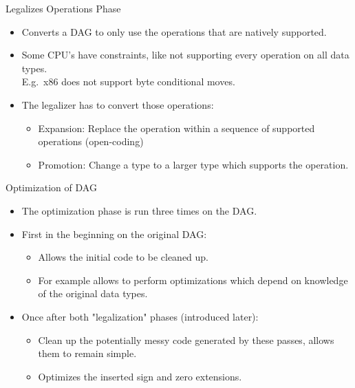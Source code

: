 \documentclass[]{beamer}
\begin{document}
\begin{frame}{Legalizes Operations Phase}
\begin{itemize}
  \item Converts a DAG to only use the operations that are natively supported.
  \item Some CPU's have constraints, like not supporting every operation on all data types.\\
        E.g.\ x86 does not support byte conditional moves.
  \item The legalizer has to convert those operations:
  \begin{itemize}
    \item Expansion: Replace the operation within a sequence of supported operations (open-coding)
    \item Promotion: Change a type to a larger type which supports the operation.
  \end{itemize} 
\end{itemize}
\end{frame}

\begin{frame}{Optimization of DAG}
\begin{itemize}
    \item The optimization phase is run three times on the DAG.
    \item First in the beginning on the original DAG:
      \begin{itemize}
        \item Allows the initial code to be cleaned up.
        \item For example allows to perform optimizations which depend on knowledge of the original data types.
      \end{itemize}
    \item Once after both "legalization" phases (introduced later):
      \begin{itemize}
        \item Clean up the potentially messy code generated by these passes, allows them to remain simple.
        \item Optimizes the inserted sign and zero extensions.
      \end{itemize}
  \end{itemize}
\end{frame}
\end{document}
